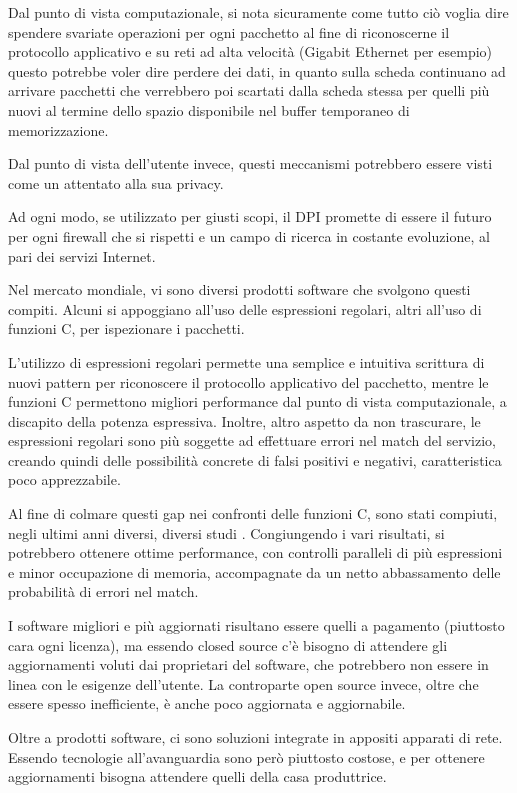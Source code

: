 Dal punto di vista computazionale, si nota sicuramente come tutto ciò voglia dire spendere svariate operazioni per ogni pacchetto al fine di riconoscerne il protocollo applicativo e su reti ad alta velocità (Gigabit Ethernet per esempio) questo potrebbe voler dire perdere dei dati, in quanto sulla scheda continuano ad arrivare pacchetti che verrebbero poi scartati dalla scheda stessa per quelli più nuovi al termine dello spazio disponibile nel buffer temporaneo di memorizzazione.

Dal punto di vista dell'utente invece, questi meccanismi potrebbero essere visti come un attentato alla sua privacy.

Ad ogni modo, se utilizzato per giusti scopi, il DPI promette di essere il futuro per ogni firewall che si rispetti e un campo di ricerca in costante evoluzione, al pari dei servizi Internet.

Nel mercato mondiale, vi sono diversi prodotti software che svolgono questi compiti. Alcuni si appoggiano all'uso delle espressioni regolari, altri all'uso di funzioni C, per ispezionare i pacchetti.

L'utilizzo di espressioni regolari permette una semplice e intuitiva scrittura di nuovi pattern per riconoscere il protocollo applicativo del pacchetto, mentre le funzioni C permettono migliori performance dal punto di vista computazionale, a discapito della potenza espressiva. Inoltre, altro aspetto da non trascurare, le espressioni regolari sono più soggette ad effettuare errori nel match del servizio, creando quindi delle possibilità concrete di falsi positivi e negativi, caratteristica poco apprezzabile.

Al fine di colmare questi gap nei confronti delle funzioni C, sono stati compiuti, negli ultimi anni diversi, diversi studi \cite{redpi0,redpi1,redpi2,redpi3}. Congiungendo i vari risultati, si potrebbero ottenere ottime performance, con controlli paralleli di più espressioni e minor occupazione di memoria, accompagnate da un netto abbassamento delle probabilità di errori nel match.

I software migliori e più aggiornati risultano essere quelli a pagamento (piuttosto cara ogni licenza), ma essendo closed source c'è bisogno di attendere gli aggiornamenti voluti dai proprietari del software, che potrebbero non essere in linea con le esigenze dell'utente. La controparte open source invece, oltre che essere spesso inefficiente, è anche poco aggiornata e aggiornabile.

Oltre a prodotti software, ci sono soluzioni integrate in appositi apparati di rete. Essendo tecnologie all'avanguardia sono però piuttosto costose, e per ottenere aggiornamenti bisogna attendere quelli della casa produttrice.


